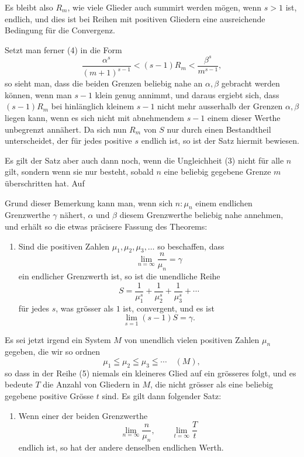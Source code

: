 \documentclass[11pt]{article}
\begin{document}
Es bleibt also $R_m$, wie viele Glieder auch summirt werden mögen, wenn $s>1$ ist, endlich, und dies ist bei Reihen mit positiven Gliedern eine ausreichende Bedingung für die Convergenz.

Setzt man ferner (4) in die Form
\[
\frac{\alpha^s}{(m+1)^{s-1}}<(s-1)R_m<\frac{\beta^s}{m^{s-1}},
\]
so sieht man, dass die beiden Grenzen beliebig nahe an $\alpha,\beta$ gebracht werden können, wenn man $s-1$ klein genug annimmt, und daraus ergiebt sich, dass $(s-1)R_m$ bei hinlänglich kleinem $s-1$ nicht mehr ausserhalb der Grenzen $\alpha,\beta$ liegen kann, wenn es sich nicht mit abnehmendem $s-1$ einem dieser Werthe unbegrenzt annähert. Da sich nun $R_m$ von $S$ nur durch einen Bestandtheil unterscheidet, der für jedes positive $s$ endlich ist, so ist der Satz hiermit bewiesen.

Es gilt der Satz aber auch dann noch, wenn die Ungleichheit (3) nicht für alle $n$ gilt, sondern wenn sie nur besteht, sobald $n$ eine beliebig gegebene Grenze $m$ überschritten hat. Auf

Grund dieser Bemerkung kann man, wenn sich $n:\mu_n$ einem endlichen Grenzwerthe $\gamma$ nähert, $\alpha$ und $\beta$ diesem Grenzwerthe beliebig nahe annehmen, und erhält so die etwas präcisere Fassung des Theorems:

\begin{enumerate}[label=\textbf{\arabic*.},leftmargin=2.2em,start=3]
\item Sind die positiven Zahlen $\mu_1,\mu_2,\mu_3,\ldots$ so beschaffen, dass
\[
\lim_{n=\infty}\frac{n}{\mu_n}=\gamma
\]
ein endlicher Grenzwerth ist, so ist die unendliche Reihe
\[
S=\frac1{\mu_1^s}+\frac1{\mu_2^s}+\frac1{\mu_3^s}+\cdots
\]
für jedes $s$, was grösser als $1$ ist, convergent, und es ist
\[
\lim_{s=1}(s-1)S=\gamma.
\]
\end{enumerate}

Es sei jetzt irgend ein System $M$ von unendlich vielen positiven Zahlen $\mu_n$ gegeben, die wir so ordnen
\begin{equation}
\mu_1\leqq\mu_2\leqq\mu_3\leqq\cdots\quad (M),
\tag{5}
\end{equation}
so dass in der Reihe (5) niemals ein kleineres Glied auf ein grösseres folgt, und es bedeute $T$ die Anzahl von Gliedern in $M$, die nicht grösser als eine beliebig gegebene positive Grösse $t$ sind. Es gilt dann folgender Satz:

\begin{enumerate}[label=\textbf{\arabic*.},leftmargin=2.2em,start=4]
\item Wenn einer der beiden Grenzwerthe
\begin{equation}
\lim_{n=\infty}\frac{n}{\mu_n},\qquad \lim_{t=\infty}\frac{T}{t}
\tag{6}
\end{equation}
endlich ist, so hat der andere denselben endlichen Werth.
\end{enumerate}
\end{document}
